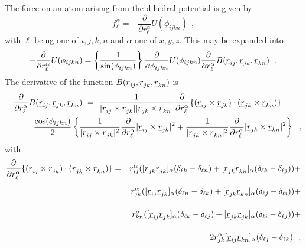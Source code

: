 The force on an atom arising from the dihedral potential is given by
\begin{equation}
f_{\ell}^{\alpha}=-\frac{\partial}{\partial
r_{\ell}^{\alpha}}U(\phi_{ijkn})~~,
\end{equation}
with $\ell$ being one of $i,j,k,n$ and $\alpha$ one of $x,y,z$.
This may be expanded into
\begin{equation}
-\frac{\partial}{\partial r_{\ell}^{\alpha}}U(\phi_{ijkn})=
\left\{\frac{1}{\sin(\phi_{ijkn})}\right\}
\frac{\partial}{\partial \phi_{ijkn}}U(\phi_{ijkn})
\frac{\partial}{\partial r_{\ell}^{\alpha}}
B(\mbox{$\underline{r}$}_{ij},\mbox{$\underline{r}$}_{jk},\mbox{$\underline{r}$}_{kn})~~.
\end{equation}
The derivative of the function
$B(\mbox{$\underline{r}$}_{ij},\mbox{$\underline{r}$}_{jk},\mbox{$\underline{r}$}_{kn})$ is
\begin{eqnarray}
& &\frac{\partial}{\partial r_{\ell}^{\alpha}}
B(\mbox{$\underline{r}$}_{ij},\mbox{$\underline{r}$}_{jk},\mbox{$\underline{r}$}_{kn})~=~
\frac{1}{|\mbox{$\underline{r}$}_{ij}\times\mbox{$\underline{r}$}_{jk}||\mbox{$\underline{r}$}_{jk}\times\mbox{$\underline{r}$}_{kn}|}
\frac{\partial}{\partial r_{\ell}^{\alpha}}
\{(\mbox{$\underline{r}$}_{ij}\times\mbox{$\underline{r}$}_{jk})\cdot(\mbox{$\underline{r}$}_{jk}\times\mbox{$\underline{r}$}_{kn})\}~-~~~~\nonumber \\
& & \phantom{x} \frac{\cos(\phi_{ijkn})}{2}\left\{
\frac{1}{|\mbox{$\underline{r}$}_{ij}\times\mbox{$\underline{r}$}_{jk}|^{2}}
\frac{\partial}{\partial r_{\ell}^{\alpha}}
|\mbox{$\underline{r}$}_{ij}\times\mbox{$\underline{r}$}_{jk}|^{2}+
\frac{1}{|\mbox{$\underline{r}$}_{jk}\times\mbox{$\underline{r}$}_{kn}|^{2}}
\frac{\partial}{\partial r_{\ell}^{\alpha}}
|\mbox{$\underline{r}$}_{jk}\times\mbox{$\underline{r}$}_{kn}|^{2} \right\}~~,
\end{eqnarray}
with
\begin{eqnarray}
\frac{\partial}{\partial r_{\ell}^{\alpha}}
\{(\vek{r}_{ij}\times\vek{r}_{jk})\cdot(\vek{r}_{jk}\times\vek{r}_{kn})\}&=&
r_{ij}^{\alpha}([\vek{r}_{jk}\vek{r}_{jk}]_{\alpha}(\delta_{\ell k}-\delta_{\ell n})+
 [\vek{r}_{jk}\vek{r}_{kn}]_{\alpha}(\delta_{\ell k}-\delta_{\ell j}))+ \nonumber \\
\phantom{\frac{\partial}{\partial r_{\ell}^{\alpha}}}& &
r_{jk}^{\alpha}([\vek{r}_{ij}\vek{r}_{jk}]_{\alpha}
(\delta_{\ell n}-\delta_{\ell k})+ [\vek{r}_{jk}\vek{r}_{kn}]_{\alpha}
(\delta_{\ell j}-\delta_{\ell i}))+ \nonumber \\
\phantom{\frac{\partial}{\partial r_{\ell}^{\alpha}}} & &
r_{kn}^{\alpha}([\vek{r}_{ij}\vek{r}_{jk}]_{\alpha}(\delta_{\ell k}-\delta_{\ell j})+
[\vek{r}_{jk}\vek{r}_{jk}]_{\alpha}(\delta_{\ell i}-\delta_{\ell j}))+ \nonumber \\
\phantom{\frac{\partial}{\partial r_{\ell}^{\alpha}}} & &
2r_{jk}^{\alpha}[\vek{r}_{ij}\vek{r}_{kn}]_{\alpha}(\delta_{\ell j}-\delta_{\ell k})~~,
\end{eqnarray}
